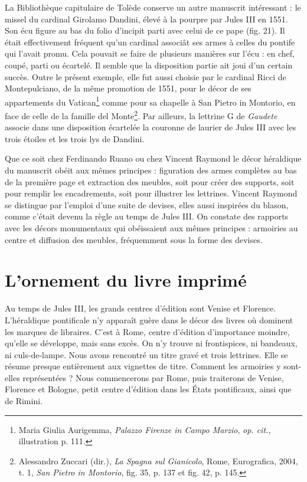 \documentclass[12pt,twoside,openany]{book}
\begin{document}
La Bibliothèque capitulaire de Tolède conserve un autre manuscrit intéressant : le missel du cardinal Girolamo Dandini, élevé à la pourpre par Jules III en 1551. Son écu figure au bas du folio d’incipit parti avec celui de ce pape (fig. 21). Il était effectivement fréquent qu’un cardinal associât ses armes à celles du pontife qui l’avait promu. Cela pouvait se faire de plusieurs manières sur l’écu : en chef, coupé, parti ou écartelé. Il semble que la disposition partie ait joui d’un certain succès. Outre le présent exemple, elle fut aussi choisie par le cardinal Ricci de Montepulciano, de la même promotion de 1551, pour le décor de ses appartements du Vatican\footnote{Maria Giulia Aurigemma, \textit{Palazzo Firenze in Campo Marzio},\textit{ op. cit.}, illustration p. 111.} comme pour sa chapelle à San Pietro in Montorio, en face de celle de la famille del Monte\footnote{Alessandro Zuccari (dir.),\textit{ La Spagna sul Gianicolo}, Rome, Eurografica, 2004, t. 1, \textit{San Pietro in Montorio}, fig. 35, p. 137 et fig. 42, p. 145.}. Par ailleurs, la lettrine G de \textit{Gaudete} associe dans une disposition écartelée la couronne de laurier de Jules III avec les trois étoiles et les trois lys de Dandini.

Que ce soit chez Ferdinando Ruano ou chez Vincent Raymond le décor héraldique du manuscrit obéit aux mêmes principes : figuration des armes complètes au bas de la première page et extraction des meubles, soit pour créer des supports, soit pour remplir les encadrements, soit pour illustrer les lettrines. Vincent Raymond se distingue par l’emploi d’une suite de devises, elles aussi inspirées du blason, comme c’était devenu la règle au temps de Jules III. On constate des rapports avec les décors monumentaux qui obéissaient aux mêmes principes : armoiries au centre et diffusion des meubles, fréquemment sous la forme des devises.

\section{L’ornement du livre imprimé}

Au temps de Jules III, les grands centres d’édition sont Venise et Florence. L’héraldique pontificale n’y apparaît guère dans le décor des livres où dominent les marques de libraires. C’est à Rome, centre d’édition d’importance moindre, qu’elle se développe, mais sans excès. On n’y trouve ni frontispices, ni bandeaux, ni culs-de-lampe. Nous avons rencontré un titre gravé et trois lettrines. Elle se résume presque entièrement aux vignettes de titre. Comment les armoiries y sont-elles représentées ? Nous commencerons par Rome, puis traiterons de Venise, Florence et Bologne, petit centre d’édition dans les États pontificaux, ainsi que de Rimini.
\end{document}
